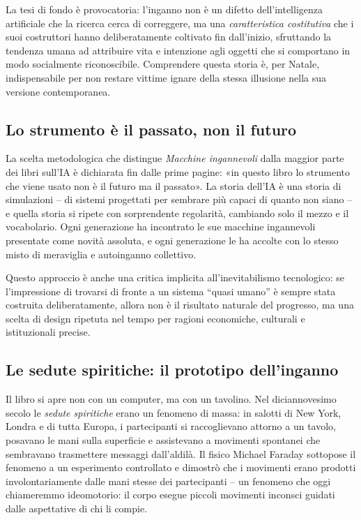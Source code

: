 \documentclass[a4paper,11pt]{article}
\begin{document}
La tesi di fondo è provocatoria: l'inganno non è un difetto dell'intelligenza artificiale che la ricerca cerca di correggere, ma una \emph{caratteristica costitutiva} che i suoi costruttori hanno deliberatamente coltivato fin dall'inizio, sfruttando la tendenza umana ad attribuire vita e intenzione agli oggetti che si comportano in modo socialmente riconoscibile. Comprendere questa storia è, per Natale, indispensabile per non restare vittime ignare della stessa illusione nella sua versione contemporanea.

\subsection{Lo strumento è il passato, non il futuro}

La scelta metodologica che distingue \emph{Macchine ingannevoli} dalla maggior parte dei libri sull'IA è dichiarata fin dalle prime pagine: «in questo libro lo strumento che viene usato non è il futuro ma il passato». La storia dell'IA è una storia di simulazioni -- di sistemi progettati per sembrare più capaci di quanto non siano -- e quella storia si ripete con sorprendente regolarità, cambiando solo il mezzo e il vocabolario. Ogni generazione ha incontrato le sue macchine ingannevoli presentate come novità assoluta, e ogni generazione le ha accolte con lo stesso misto di meraviglia e autoinganno collettivo.

Questo approccio è anche una critica implicita all'inevitabilismo tecnologico: se l'impressione di trovarsi di fronte a un sistema ``quasi umano'' è sempre stata costruita deliberatamente, allora non è il risultato naturale del progresso, ma una scelta di design ripetuta nel tempo per ragioni economiche, culturali e istituzionali precise.

\subsection{Le sedute spiritiche: il prototipo dell'inganno}

Il libro si apre non con un computer, ma con un tavolino. Nel diciannovesimo secolo le \emph{sedute spiritiche} erano un fenomeno di massa: in salotti di New York, Londra e di tutta Europa, i partecipanti si raccoglievano attorno a un tavolo, posavano le mani sulla superficie e assistevano a movimenti spontanei che sembravano trasmettere messaggi dall'aldilà. Il fisico Michael Faraday sottopose il fenomeno a un esperimento controllato e dimostrò che i movimenti erano prodotti involontariamente dalle mani stesse dei partecipanti -- un fenomeno che oggi chiameremmo ideomotorio: il corpo esegue piccoli movimenti inconsci guidati dalle aspettative di chi li compie.
\end{document}
